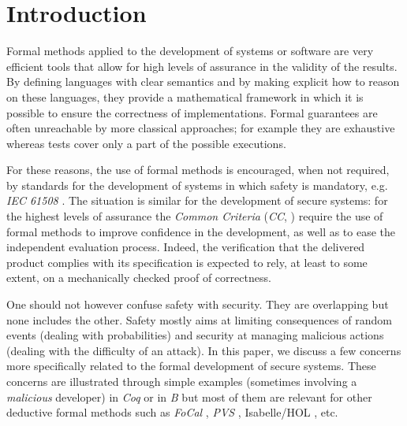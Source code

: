 \documentclass[conference]{IEEEtran}
\begin{document}
\newcommand{\subimg}[2]
{{#1} \vartriangleright \hspace{-10pt} - \hspace{4pt} {#2}}

\newcommand{\surcharge}[2]
{{#1} < \hspace{-6pt} + \hspace{2pt} {#2}}

\newcommand{\choice}{\ensuremath{\talloblong}}

\newcommand{\guard}{\ensuremath{\Longrightarrow}}

\newcommand{\fid}[1]
{\ensuremath{\textrm{\emph{#1}}}}

\newtheorem{example}{Exemple}[section]
\newtheorem{remark}{Remarque}[section]
\newtheorem{notation}{Notation}[section]



\section{Introduction}\label{introduction}

Formal methods applied to the development of systems or software are very efficient tools that
allow for high levels of assurance in the validity of the results. By defining languages with
clear semantics and by making explicit how to reason on these languages, they provide a
mathematical framework in which it is possible to ensure the correctness of implementations.
Formal guarantees are often unreachable by more classical approaches; for example they are
exhaustive whereas tests cover only a part of the possible executions.

For these reasons, the use of formal methods is encouraged, when not required, by standards
for the development of systems in which safety is mandatory, e.g. \emph{IEC 61508}
\cite{iec61508}. The situation is similar for the development of secure systems: for the
highest levels of assurance the \emph{Common Criteria} (\emph{CC}, \cite{CommonCriteria})
require the use of formal methods to improve confidence in the development, as well as to ease
the independent evaluation process. Indeed, the verification that the delivered product
complies with its specification is expected to rely, at least to some extent, on a
mechanically checked proof of correctness.

One should not however confuse safety with security. They are overlapping but none includes
the other. Safety mostly aims at limiting consequences of random events (dealing with
probabilities) and security at managing malicious actions (dealing with the difficulty of an
attack). In this paper, we discuss a few concerns more specifically related to the formal
development of secure systems. These concerns are illustrated through simple examples
(sometimes involving a \emph{malicious} developer) in \emph{Coq} \cite{coq:1} or in \emph{B}
\cite{abr:1} but most of them are relevant for other deductive formal methods such as
\emph{FoCal} \cite{focal}, \emph{PVS} \cite{pvs:1}, Isabelle/HOL \cite{nip:1}, etc.
\end{document}
